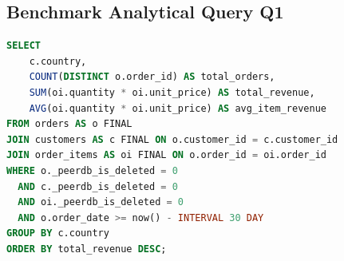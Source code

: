 \documentclass[peerreviewca]{IEEEtran}
\begin{document}
\subsection{Benchmark Analytical Query Q1}
\begin{lstlisting}[language=SQL, caption={Q1: Revenue and Average Ticket by Country (ClickHouse Syntax)}]
SELECT 
    c.country,
    COUNT(DISTINCT o.order_id) AS total_orders,
    SUM(oi.quantity * oi.unit_price) AS total_revenue,
    AVG(oi.quantity * oi.unit_price) AS avg_item_revenue
FROM orders AS o FINAL
JOIN customers AS c FINAL ON o.customer_id = c.customer_id
JOIN order_items AS oi FINAL ON o.order_id = oi.order_id
WHERE o._peerdb_is_deleted = 0
  AND c._peerdb_is_deleted = 0
  AND oi._peerdb_is_deleted = 0
  AND o.order_date >= now() - INTERVAL 30 DAY
GROUP BY c.country
ORDER BY total_revenue DESC;
\end{lstlisting}
\end{document}
